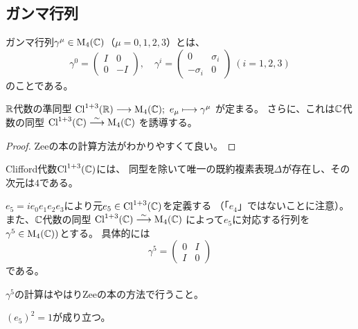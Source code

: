 \subsection{ガンマ行列}
\begin{dfn}
  ガンマ行列$\gamma^{\mu} \in \operatorname{M}_4(\mathbb{C})$（$\mu=0,1,2,3$）とは、
  \begin{equation}
    \gamma^0 = \begin{pmatrix}I&0\\0&-I\end{pmatrix},\quad
    \gamma^i = \begin{pmatrix}0&\sigma_i\\-\sigma_i&0\end{pmatrix}
    \ (i=1,2,3)
  \end{equation}
  のことである。
\end{dfn}

\begin{thm}
  $\mathbb{R}$代数の準同型
  $\operatorname{Cl}^{1+3}(\mathbb{R})\longrightarrow \operatorname{M}_4(\mathbb{C});\ e_\mu \longmapsto \gamma^\mu$
  が定まる。
  さらに、これは$\mathbb{C}$代数の同型
  $\operatorname{Cl}^{1+3}(\mathbb{C})\stackrel{\sim}{\longrightarrow} \operatorname{M}_4(\mathbb{C})$
  を誘導する。
\end{thm}

\begin{proof}
  Zeeの本の計算方法がわかりやすくて良い。
\end{proof}

\begin{dfn}
  Clifford代数$\operatorname{Cl}^{1+3}(\mathbb{C})$には、
  同型を除いて唯一の既約複素表現$\Delta$が存在し、その次元は$4$である。
\end{dfn}

\begin{dfn}
  $e_5=ie_0e_1e_2e_3$により元$e_5\in\operatorname{Cl}^{1+3}(\mathbb{C})$を定義する
  （「$e_4$」ではないことに注意）。
  また、$\mathbb{C}$代数の同型
  $\operatorname{Cl}^{1+3}(\mathbb{C})\stackrel{\sim}{\longrightarrow} \operatorname{M}_4(\mathbb{C})$
  によって$e_5$に対応する行列を$\gamma^5\in \operatorname{M}_4(\mathbb{C}))$とする。
  具体的には
  \begin{equation}
    \gamma^5=\begin{pmatrix}0&I\\I&0\end{pmatrix}
  \end{equation}
  である。
\end{dfn}

\begin{rem}
  $\gamma^5$の計算はやはりZeeの本の方法で行うこと。
\end{rem}

\begin{thm}
  $(e_5)^2=1$が成り立つ。
\end{thm}

